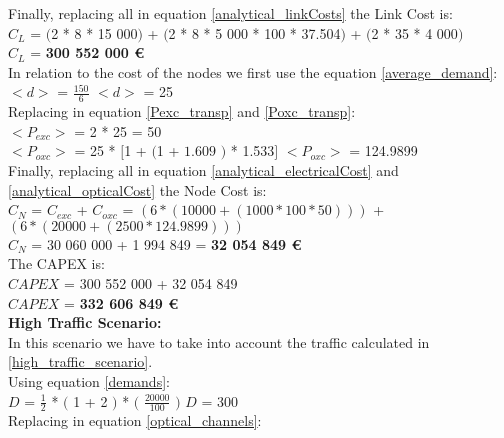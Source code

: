 Finally, replacing all in equation \ref{analytical_linkCosts} the Link Cost is:\\

$C_L$ = $($2 * 8 * 15 000$)$ + $($2 * 8 * 5 000 * 100 * 37.504$)$ + $($2 * 35 * 4 000$)$\\

$C_L$ = \textbf{300 552 000 \euro}\\

In relation to the cost of the nodes we first use the equation \ref{average_demand}:\\

$<d>$ = $\frac{150}{6}$ \qquad \qquad $<d>$ = 25\\

Replacing in equation \ref{Pexc_transp} and \ref{Poxc_transp}:\\

$<P_{exc}>$ = 2 * 25 = 50\\

$<P_{oxc}>$ = 25 * $[$1 + $($1 + $1.609$ $)$ * 1.533$]$ \qquad \quad $<P_{oxc}>$ = 124.9899 \\

Finally, replacing all in equation \ref{analytical_electricalCost} and \ref{analytical_opticalCost} the Node Cost is:\\

$C_N$ = $C_{exc}$ + $C_{oxc}$ = $\left( 6*(10 000 + (1 000 * 100 * 50 ) ) \right)$ + $\left(6*(20 000 + (2 500 * 124.9899 ) ) \right)$\\

$C_N$ = 30 060 000 + 1 994 849 = \textbf{32 054 849 \euro}\\

The CAPEX is:\\
$CAPEX$ = 300 552 000 + 32 054 849\\

$CAPEX$ = \textbf{332 606 849 \euro}\\


\textbf{High Traffic Scenario:}\\
In this scenario we have to take into account the traffic calculated in \ref{high_traffic_scenario}.\\

Using equation \ref{demands}:\\

$D$ = $\frac{1}{2}$ * $($ 1 + 2 $)$ * $($ $\frac{20000}{100}$ $)$ \qquad \qquad $D$ = 300\\

Replacing in equation \ref{optical_channels}:\\

